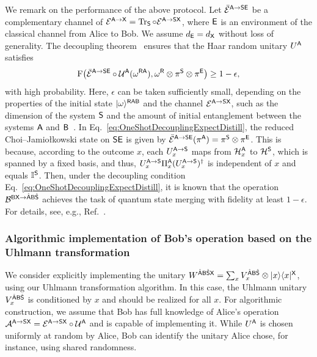 We remark on the performance of the above protocol.
Let $\bar{{\mathcal{E}}}^{{\mathsf{A}}\rightarrow{\mathsf{S}}{\mathsf{E}}}$ be a complementary channel of ${\mathcal{E}}^{{\mathsf{A}}\rightarrow{\mathsf{X}}} = \operatorname{Tr}_{\mathsf{S}}\circ{\mathcal{E}}^{{\mathsf{A}}\rightarrow{\mathsf{S}}{\mathsf{X}}}$, where ${\mathsf{E}}$ is an environment of the classical channel from Alice to Bob.
We assume $d_{\mathsf{E}} = d_{\mathsf{X}}$ without loss of generality.
The decoupling theorem~\cite{dupuis2014one} ensures that the Haar random unitary $U^{\mathsf{A}}$ satisfies
\begin{align}
\label{eq:OneShotDecouplingExpectDistill}
    {\mathrm{F}}\big(\bar{{\mathcal{E}}}^{{\mathsf{A}}\rightarrow{\mathsf{S}}{\mathsf{E}}}\circ{\mathcal{U}}^{\mathsf{A}}(\omega^{{\mathsf{R}}{\mathsf{A}}}), \omega^{\mathsf{R}} \otimes \pi^{\mathsf{S}} \otimes \pi^{\mathsf{E}} \big) \geq 1 - \epsilon,
\end{align}
with high probability.
Here, $\epsilon$ can be taken sufficiently small, depending on the properties of the initial state $|\omega\rangle^{{\mathsf{R}}{\mathsf{A}}{\mathsf{B}}}$ and the channel ${\mathcal{E}}^{{\mathsf{A}}\rightarrow{\mathsf{S}}{\mathsf{X}}}$, such as the dimension of the system ${\mathsf{S}}$ and the amount of initial entanglement between the systems ${\mathsf{A}}$ and ${\mathsf{B}}$~\cite{dupuis2014one}.
In Eq.~\eqref{eq:OneShotDecouplingExpectDistill}, the reduced Choi--Jamio\l kowski state on ${\mathsf{S}}{\mathsf{E}}$ is given by $\bar{{\mathcal{E}}}^{{\mathsf{A}}\rightarrow{\mathsf{S}}{\mathsf{E}}}(\pi^{\mathsf{A}}) = \pi^{\mathsf{S}} \otimes \pi^{\mathsf{E}}$.
This is because, according to the outcome $x$, each $U_x^{{\mathsf{A}}\rightarrow{\mathsf{S}}}$ maps from ${\mathcal{H}}_x^{\mathsf{A}}$ to ${\mathcal{H}}^{\mathsf{S}}$, which is spanned by a fixed basis, and thus, $U_x^{{\mathsf{A}}\rightarrow {\mathsf{S}}}\Pi_x^{\mathsf{A}}(U_x^{{\mathsf{A}}\rightarrow{\mathsf{S}}})^\dag$ is independent of $x$ and equals $\mathbb{I}^{\mathsf{S}}$.
Then, under the decoupling condition Eq.~\eqref{eq:OneShotDecouplingExpectDistill}, it is known that the operation ${\mathcal{B}}^{{\mathsf{B}}{\mathsf{X}}\rightarrow\hat{{\mathsf{A}}}{\mathsf{B}}\hat{{\mathsf{S}}}}$ achieves the task of quantum state merging with fidelity at least $1-\epsilon$. For details, see, e.g., Ref.~\cite{khatri2024principlemodern}.








\subsubsection{Algorithmic implementation of Bob's operation based on the Uhlmann transformation}
\label{sec:implement uhl in state merging}


We consider explicitly implementing the unitary $W^{\hat{{\mathsf{A}}}{\mathsf{B}}\hat{{\mathsf{S}}}{\mathsf{X}}} = \sum_x V_x^{\hat{{\mathsf{A}}}{\mathsf{B}}\hat{{\mathsf{S}}}} \otimes |x\rangle\langle x|^{\mathsf{X}}$, using our Uhlmann transformation algorithm.
In this case, the Uhlmann unitary $V_x^{\hat{{\mathsf{A}}}{\mathsf{B}}\hat{{\mathsf{S}}}}$ is conditioned by $x$ and should be realized for all $x$.
For algorithmic construction, we assume that Bob has full knowledge of Alice's operation ${\mathcal{A}}^{{\mathsf{A}}\rightarrow{\mathsf{S}}{\mathsf{X}}} = {\mathcal{E}}^{{\mathsf{A}}\rightarrow{\mathsf{S}}{\mathsf{X}}}\circ{\mathcal{U}}^{\mathsf{A}}$ and is capable of implementing it. 
While $U^{\mathsf{A}}$ is chosen uniformly at random by Alice, Bob can identify the unitary Alice chose, for instance, using shared randomness.

